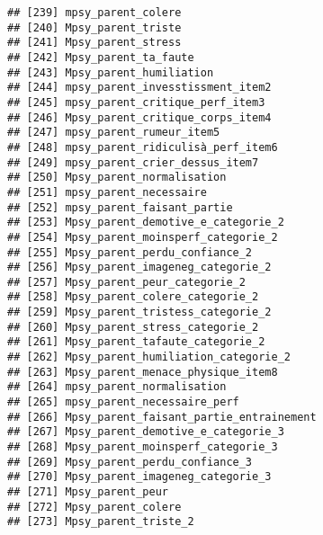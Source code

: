 \documentclass[
]{article}
\begin{document}
\begin{verbatim}
## [239] mpsy_parent_colere                                               
## [240] Mpsy_parent_triste                                               
## [241] Mpsy_parent_stress                                               
## [242] Mpsy_parent_ta_faute                                             
## [243] Mpsy_parent_humiliation                                          
## [244] mpsy_parent_invesstissment_item2                                 
## [245] mpsy_parent_critique_perf_item3                                  
## [246] Mpsy_parent_critique_corps_item4                                 
## [247] mpsy_parent_rumeur_item5                                         
## [248] mpsy_parent_ridiculisà_perf_item6                                
## [249] mpsy_parent_crier_dessus_item7                                   
## [250] Mpsy_parent_normalisation                                        
## [251] mpsy_parent_necessaire                                           
## [252] mpsy_parent_faisant_partie                                       
## [253] Mpsy_parent_demotive_e_categorie_2                               
## [254] Mpsy_parent_moinsperf_categorie_2                                
## [255] Mpsy_parent_perdu_confiance_2                                    
## [256] Mpsy_parent_imageneg_categorie_2                                 
## [257] Mpsy_parent_peur_categorie_2                                     
## [258] Mpsy_parent_colere_categorie_2                                   
## [259] Mpsy_parent_tristess_categorie_2                                 
## [260] Mpsy_parent_stress_categorie_2                                   
## [261] Mpsy_parent_tafaute_categorie_2                                  
## [262] Mpsy_parent_humiliation_categorie_2                              
## [263] Mpsy_parent_menace_physique_item8                                
## [264] mpsy_parent_normalisation                                        
## [265] mpsy_parent_necessaire_perf                                      
## [266] Mpsy_parent_faisant_partie_entrainement                          
## [267] Mpsy_parent_demotive_e_categorie_3                               
## [268] Mpsy_parent_moinsperf_categorie_3                                
## [269] Mpsy_parent_perdu_confiance_3                                    
## [270] Mpsy_parent_imageneg_categorie_3                                 
## [271] Mpsy_parent_peur                                                 
## [272] Mpsy_parent_colere                                               
## [273] Mpsy_parent_triste_2                                             

\end{verbatim}
\end{document}
